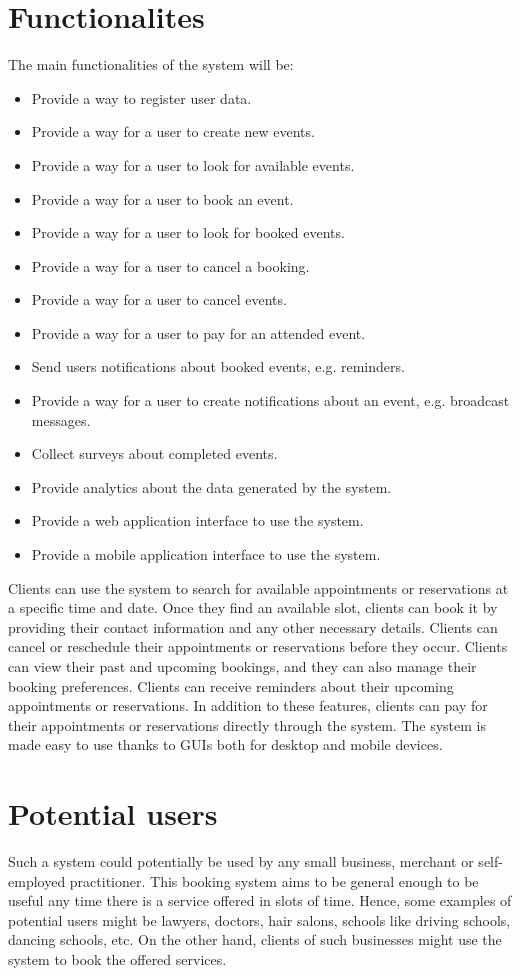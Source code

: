 \documentclass{article}
\begin{document}
\section{Functionalites}
The main functionalities of the system will be:
\begin{itemize}
    \item Provide a way to register user data.
    \item Provide a way for a user to create new events.
    \item Provide a way for a user to look for available events.
    \item Provide a way for a user to book an event.
    \item Provide a way for a user to look for booked events.
    \item Provide a way for a user to cancel a booking.
    \item Provide a way for a user to cancel events.
    \item Provide a way for a user to pay for an attended event.
    \item Send users notifications about booked events, e.g. reminders.
    \item Provide a way for a user to create notifications about an event, e.g. broadcast messages.
    \item Collect surveys about completed events.
    \item Provide analytics about the data generated by the system.
    \item Provide a web application interface to use the system.
    \item Provide a mobile application interface to use the system.
\end{itemize}

Clients can use the system to search for available appointments or reservations at a specific time and date. Once they find an available slot, clients can book it by providing their contact information and any other necessary details. Clients can cancel or reschedule their appointments or reservations before they occur. Clients can view their past and upcoming bookings, and they can also manage their booking preferences. Clients can receive reminders about their upcoming appointments or reservations. In addition to these features, clients can pay for their appointments or reservations directly through the system. The system is made easy to use thanks to GUIs both for desktop and mobile devices.

\section{Potential users}
Such a system could potentially be used by any small business, merchant or
self-employed practitioner. This booking system aims to be general enough to be
useful any time there is a service offered in slots of time. Hence, some 
examples of potential users might be lawyers, doctors, hair salons, schools like driving schools, dancing schools, etc. On the other hand, clients of such businesses might use the system to book the offered services.
\end{document}
